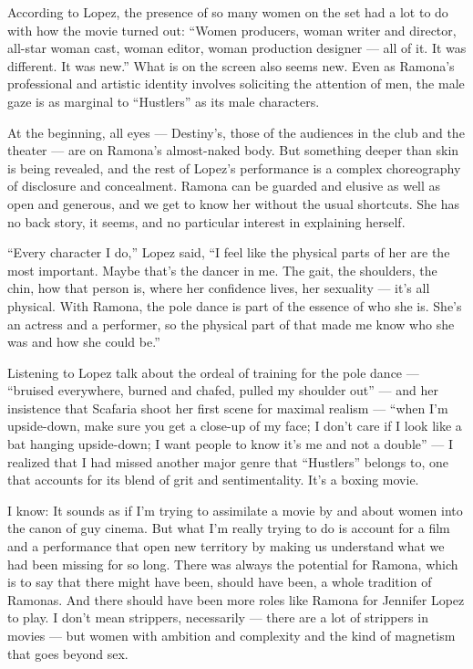 According to Lopez, the presence of so many women on the set had a lot
to do with how the movie turned out: ``Women producers, woman writer and
director, all-star woman cast, woman editor, woman production designer
--- all of it. It was different. It was new.'' What is on the screen
also seems new. Even as Ramona's professional and artistic identity
involves soliciting the attention of men, the male gaze is as marginal
to ``Hustlers'' as its male characters.

At the beginning, all eyes --- Destiny's, those of the audiences in the
club and the theater --- are on Ramona's almost-naked body. But
something deeper than skin is being revealed, and the rest of Lopez's
performance is a complex choreography of disclosure and concealment.
Ramona can be guarded and elusive as well as open and generous, and we
get to know her without the usual shortcuts. She has no back story, it
seems, and no particular interest in explaining herself.

``Every character I do,'' Lopez said, ``I feel like the physical parts
of her are the most important. Maybe that's the dancer in me. The gait,
the shoulders, the chin, how that person is, where her confidence lives,
her sexuality --- it's all physical. With Ramona, the pole dance is part
of the essence of who she is. She's an actress and a performer, so the
physical part of that made me know who she was and how she could be.''

Listening to Lopez talk about the ordeal of training for the pole dance
--- ``bruised everywhere, burned and chafed, pulled my shoulder out''
--- and her insistence that Scafaria shoot her first scene for maximal
realism --- ``when I'm upside-down, make sure you get a close-up of my
face; I don't care if I look like a bat hanging upside-down; I want
people to know it's me and not a double'' --- I realized that I had
missed another major genre that ``Hustlers'' belongs to, one that
accounts for its blend of grit and sentimentality. It's a boxing movie.

I know: It sounds as if I'm trying to assimilate a movie by and about
women into the canon of guy cinema. But what I'm really trying to do is
account for a film and a performance that open new territory by making
us understand what we had been missing for so long. There was always the
potential for Ramona, which is to say that there might have been, should
have been, a whole tradition of Ramonas. And there should have been more
roles like Ramona for Jennifer Lopez to play. I don't mean strippers,
necessarily --- there are a lot of strippers in movies --- but women
with ambition and complexity and the kind of magnetism that goes beyond
sex.

